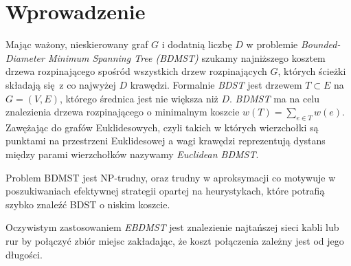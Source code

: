\section{Wprowadzenie}
Mając ważony, nieskierowany graf $G$ i dodatnią liczbę $D$ w problemie \textit{Bounded-Diameter Minimum Spanning Tree (BDMST)} szukamy najniższego kosztem drzewa rozpinającego spośród wszystkich drzew rozpinających $G$, których ścieżki składają się z co najwyżej $D$ krawędzi. Formalnie \textit{BDST} jest drzewem $T \subset E$ na $G = (V, E)$, którego średnica jest nie większa niż $D$. \textit{BDMST} ma na celu znalezienia drzewa rozpinającego o minimalnym koszcie $w(T) = \sum_{e\in T} w(e)$. Zawężając do grafów Euklidesowych, czyli takich w których wierzchołki są punktami na przestrzeni Euklidesowej a wagi krawędzi reprezentują dystans między parami wierzchołków nazywamy \textit{Euclidean BDMST}.

Problem BDMST jest NP-trudny, oraz trudny w aproksymacji co motywuje w poszukiwaniach efektywnej strategii opartej na heurystykach, które potrafią szybko znaleźć BDST o niskim koszcie.

Oczywistym zastosowaniem \textit{EBDMST} jest znalezienie najtańszej sieci kabli lub rur by połączyć zbiór miejsc zakładając, że koszt połączenia zależny jest od jego długości.

